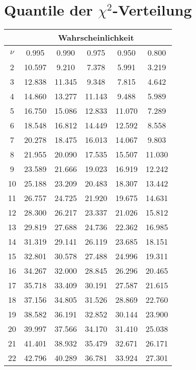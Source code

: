 \section{Quantile der $\chi^2$-Verteilung}

\begin{small}
\begin{tabular}{c||c|c|c|c|c|}
 & \multicolumn{5}{c|}{Wahrscheinlichkeit}\\
\hline
$\nu$ & 0.995 & 0.990 & 0.975 & 0.950 & 0.800 \\
\hline\hline
2 & 10.597 & 9.210 & 7.378 & 5.991 & 3.219 \\
\hline
3 & 12.838 & 11.345 & 9.348 & 7.815 & 4.642 \\
\hline
4 & 14.860 & 13.277 & 11.143 & 9.488 & 5.989 \\
\hline
5 & 16.750 & 15.086 & 12.833 & 11.070 & 7.289 \\
\hline
6 & 18.548 & 16.812 & 14.449 & 12.592 & 8.558 \\
\hline
7 & 20.278 & 18.475 & 16.013 & 14.067 & 9.803 \\
\hline
8 & 21.955 & 20.090 & 17.535 & 15.507 & 11.030 \\
\hline
9 & 23.589 & 21.666 & 19.023 & 16.919 & 12.242 \\
\hline
10 & 25.188 & 23.209 & 20.483 & 18.307 & 13.442 \\
\hline
11 & 26.757 & 24.725 & 21.920 & 19.675 & 14.631 \\
\hline
12 & 28.300 & 26.217 & 23.337 & 21.026 & 15.812 \\
\hline
13 & 29.819 & 27.688 & 24.736 & 22.362 & 16.985 \\
\hline
14 & 31.319 & 29.141 & 26.119 & 23.685 & 18.151 \\
\hline
15 & 32.801 & 30.578 & 27.488 & 24.996 & 19.311 \\
\hline
16 & 34.267 & 32.000 & 28.845 & 26.296 & 20.465 \\
\hline
17 & 35.718 & 33.409 & 30.191 & 27.587 & 21.615 \\
\hline
18 & 37.156 & 34.805 & 31.526 & 28.869 & 22.760 \\
\hline
19 & 38.582 & 36.191 & 32.852 & 30.144 & 23.900 \\
\hline
20 & 39.997 & 37.566 & 34.170 & 31.410 & 25.038 \\
\hline
21 & 41.401 & 38.932 & 35.479 & 32.671 & 26.171 \\
\hline
22 & 42.796 & 40.289 & 36.781 & 33.924 & 27.301 \\
\hline

\end{tabular}
\end{small}
